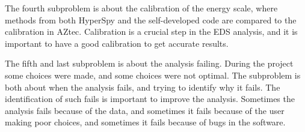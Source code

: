 \begin{center}
    \vspace*{0.2cm}

    \vspace*{0.2cm}
\end{center}




The fourth subproblem is about the calibration of the energy scale, where methods from both HyperSpy and the self-developed code are compared to the calibration in AZtec.
Calibration is a crucial step in the EDS analysis, and it is important to have a good calibration to get accurate results.

\begin{center}
    \vspace*{0.2cm}

    \vspace*{0.2cm}
\end{center}



The fifth and last subproblem is about the analysis failing.
During the project some choices were made, and some choices were not optimal.
The subproblem is both about when the analysis fails, and trying to identify why it fails.
The identification of such fails is important to improve the analysis.
Sometimes the analysis fails because of the data, and sometimes it fails because of the user making poor choices, and sometimes it fails because of bugs in the software.


\begin{center}
    \vspace*{0.2cm}

    \vspace*{0.2cm}
\end{center}






